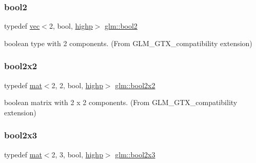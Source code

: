 \subsubsection{\texorpdfstring{bool2}{bool2}}
{\footnotesize\ttfamily typedef \hyperlink{structglm_1_1vec}{vec}$<$2, bool, \hyperlink{namespaceglm_a36ed105b07c7746804d7fdc7cc90ff25ac6f7eab42eacbb10d59a58e95e362074}{highp}$>$ \hyperlink{group__gtx__compatibility_ga19e8114c90e2c81cfa87db72f4020b52}{glm\+::bool2}}



boolean type with 2 components. (From G\+L\+M\+\_\+\+G\+T\+X\+\_\+compatibility extension) 

\mbox{\label{group__gtx__compatibility_ga1a3707855138ba2d14b7f2ccfb93f476}} 
\subsubsection{\texorpdfstring{bool2x2}{bool2x2}}
{\footnotesize\ttfamily typedef \hyperlink{structglm_1_1mat}{mat}$<$2, 2, bool, \hyperlink{namespaceglm_a36ed105b07c7746804d7fdc7cc90ff25ac6f7eab42eacbb10d59a58e95e362074}{highp}$>$ \hyperlink{group__gtx__compatibility_ga1a3707855138ba2d14b7f2ccfb93f476}{glm\+::bool2x2}}



boolean matrix with 2 x 2 components. (From G\+L\+M\+\_\+\+G\+T\+X\+\_\+compatibility extension) 

\mbox{\label{group__gtx__compatibility_gabbcc655d12f2f13ddc1917414389e8e1}} 
\subsubsection{\texorpdfstring{bool2x3}{bool2x3}}
{\footnotesize\ttfamily typedef \hyperlink{structglm_1_1mat}{mat}$<$2, 3, bool, \hyperlink{namespaceglm_a36ed105b07c7746804d7fdc7cc90ff25ac6f7eab42eacbb10d59a58e95e362074}{highp}$>$ \hyperlink{group__gtx__compatibility_gabbcc655d12f2f13ddc1917414389e8e1}{glm\+::bool2x3}}



